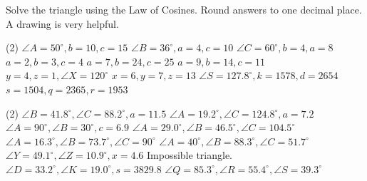 \documentclass[12pt,fleqn]{book}
\newcommand{\prb}[1]{\begin{Exercise}\parbox[t]{\textwidth-5em}{#1}\end{Exercise}}
\newcommand{\sol}[1]{\begin{Answer}\parbox[t]{\textwidth-5em}{#1}\end{Answer}}
\begin{document}
\prb{
	Solve the triangle using the Law of Cosines. Round answers to one decimal place.  A drawing is very helpful.
	\begin{tasks}(2) 
		\task $\angle A=50^{\circ}, b=10, c=15$
		\vspace{12em}
		\task $\angle B=36^{\circ}, a=4, c=10$
		\vspace{12em}
		\task $\angle C=60^{\circ}, b=4, a=8$
		\vspace{12em}
		\task $a=2, b=3, c=4$
		\vspace{12em}
		\task $a=7, b=24, c=25$
		\vspace{12em}
		\task $a=9, b=14, c=11$
		\vspace{12em}
		\task $y=4, z=1, \angle X=120^{\circ}$
		\vspace{12em}
		\task $x=6, y=7, z=13$
		\vspace{12em}
		\task $\angle S=127.8^{\circ}, k=1578, d=2654$
		\vspace{12em}
		\task $s=1504, q=2365, r=1953$
		\vspace{12em}
	\end{tasks}
}
\sol{
	\begin{tasks}(2)
		\task $\angle B=41.8^{\circ}, \angle C=88.2^{\circ}, a=11.5$
		\task $\angle A=19.2^{\circ}, \angle C=124.8^{\circ}, a=7.2$
		\task $\angle A=90^{\circ}, \angle B=30^{\circ}, c=6.9$
		\task $\angle A=29.0^{\circ}, \angle B=46.5^{\circ}, \angle C=104.5^{\circ}$
		\task $\angle A=16.3^{\circ}, \angle B=73.7^{\circ}, \angle C=90^{\circ}$
		\task $\angle A=40^{\circ}, \angle B=88.3^{\circ}, \angle C=51.7^{\circ}$
		\task $\angle Y=49.1^{\circ}, \angle Z=10.9^{\circ}, x=4.6$
		\task Impossible triangle.
		\task $\angle D=33.2^{\circ}, \angle K=19.0^{\circ}, s=3829.8$
		\task $\angle Q=85.3^{\circ}, \angle R=55.4^{\circ}, \angle S=39.3^{\circ}$
	\end{tasks}
}
\end{document}

